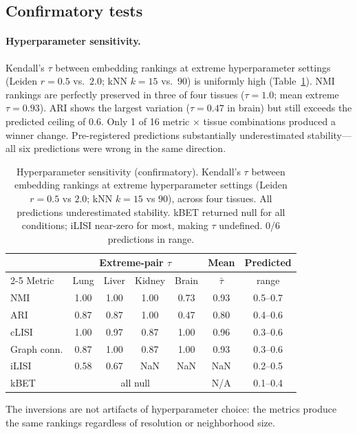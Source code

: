 \documentclass[11pt]{article}
\begin{document}
\subsection{Confirmatory tests}
\label{sec:confirmatory}

\paragraph{Hyperparameter sensitivity.} Kendall's $\tau$ between embedding rankings at extreme hyperparameter settings (Leiden $r = 0.5$ vs.\ $2.0$; kNN $k = 15$ vs.\ $90$) is uniformly high (Table~\ref{tab:hyperparam}). NMI rankings are perfectly preserved in three of four tissues ($\tau = 1.0$; mean extreme $\tau = 0.93$). ARI shows the largest variation ($\tau = 0.47$ in brain) but still exceeds the predicted ceiling of $0.6$. Only 1 of 16 metric $\times$ tissue combinations produced a winner change. Pre-registered predictions substantially underestimated stability---all six predictions were wrong in the same direction.

\begin{table}[t]
\centering
\caption{Hyperparameter sensitivity (confirmatory). Kendall's $\tau$ between embedding rankings at extreme hyperparameter settings (Leiden $r = 0.5$ vs $2.0$; kNN $k = 15$ vs $90$), across four tissues. All predictions underestimated stability. kBET returned null for all conditions; iLISI near-zero for most, making $\tau$ undefined. 0/6 predictions in range.}
\label{tab:hyperparam}
\small
\begin{tabular}{@{}lcccccc@{}}
\toprule
 & \multicolumn{4}{c}{Extreme-pair $\tau$} & Mean & Predicted \\
\cmidrule(lr){2-5}
Metric & Lung & Liver & Kidney & Brain & $\bar{\tau}$ & range \\
\midrule
NMI & 1.00 & 1.00 & 1.00 & 0.73 & 0.93 & 0.5--0.7 \\
ARI & 0.87 & 0.87 & 1.00 & 0.47 & 0.80 & 0.4--0.6 \\
cLISI & 1.00 & 0.97 & 0.87 & 1.00 & 0.96 & 0.3--0.6 \\
Graph conn. & 0.87 & 1.00 & 0.87 & 1.00 & 0.93 & 0.3--0.6 \\
iLISI & 0.58 & 0.67 & NaN & NaN & NaN & 0.2--0.5 \\
kBET & \multicolumn{4}{c}{all null} & N/A & 0.1--0.4 \\
\bottomrule
\end{tabular}
\end{table}

The inversions are not artifacts of hyperparameter choice: the metrics produce the same rankings regardless of resolution or neighborhood size.
\end{document}
